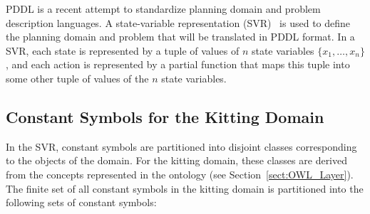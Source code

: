 PDDL is a recent attempt to standardize planning domain and problem description languages. A state-variable representation (SVR)~\cite{NAU.2004} is used to define the planning domain and problem that will be translated in PDDL format. In a SVR, each state is represented by a tuple of values of $n$ state variables $\lbrace x_1,\dots,x_n\rbrace$, and each action is represented by a partial function that maps this tuple into some other tuple of values of the $n$ state variables.

\subsection{Constant Symbols for the Kitting Domain}
In the SVR, constant symbols are partitioned into disjoint classes corresponding to the objects of the domain. For the kitting domain, these classes are derived from the concepts represented in the ontology (see Section~\ref{sect:OWL_Layer}). The finite set of all constant symbols in the kitting domain is partitioned into the following sets of constant symbols:
